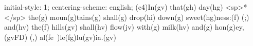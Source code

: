 initial-style: 1;
centering-scheme: english;
(c4)In(gv) that(gh) day(hg) <sp>*</sp> the(g) moun(g)tains(g) shall(g) drop(hi) down(g) sweet(hg)ness:(f) (;) and(hv) the(f) hills(gv) shall(hv) flow(jv) with(g) milk(hv) and(g) hon(g)ey,(gvFD) (,) al(fe~)le(fg)lu(gv)ia.(gv)
